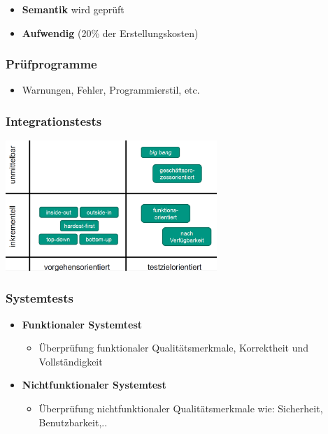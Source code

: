 \begin{itemize}
\item \textbf{Semantik} wird geprüft
\item \textbf{Aufwendig} (20\% der Erstellungskosten)
\end{itemize}

\subsubsection{Prüfprogramme}
		
\begin{itemize}
\item Warnungen, Fehler, Programmierstil, etc.
\end{itemize}

\subsubsection{Integrationstests}
		
\begin{center}
\includegraphics[width=0.6\textwidth]{../images/integrationstests.png}
\end{center}
	
\subsubsection{Systemtests}
			
\begin{itemize}
\item \textbf{Funktionaler Systemtest}
\begin{itemize}
\item Überprüfung funktionaler Qualitätsmerkmale, Korrektheit und Vollständigkeit
\end{itemize}
\item \textbf{Nichtfunktionaler Systemtest}
\begin{itemize}
\item Überprüfung nichtfunktionaler Qualitätsmerkmale wie: Sicherheit, Benutzbarkeit,..
\end{itemize}
\end{itemize}
	
